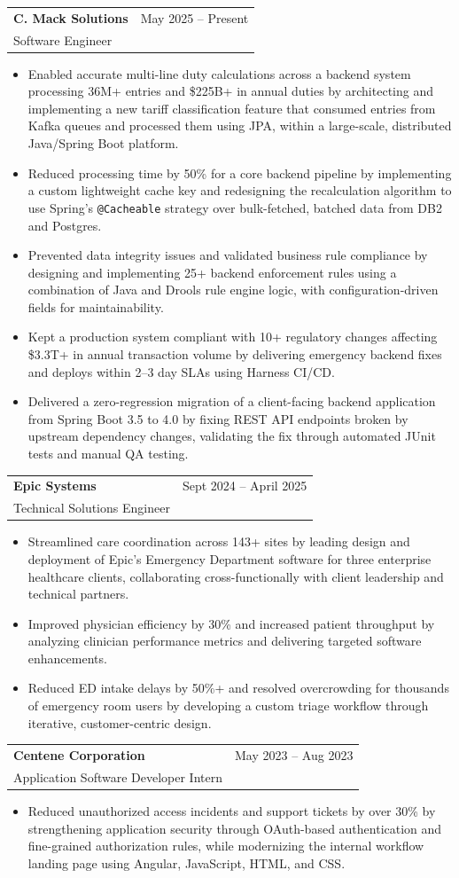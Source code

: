 \documentclass[letterpaper,11pt]{article}
\makeatletter
\newcommand{\resumeItem}[1]{
  \item\small{
    {#1 \vspace{-2pt}}
  }
}
\newcommand{\resumeSubheading}[4]{
  \vspace{-1pt}\item
    \begin{tabular*}{0.97\textwidth}[t]{l@{\extracolsep{\fill}}r}
      \textbf{#1} & #2 \\
      #3 & \textit{\small #4} \\
    \end{tabular*}\vspace{-5pt}
}
\newcommand{\resumeItemListStart}{\begin{itemize}[itemsep=-1pt]}
\newcommand{\resumeItemListEnd}{\end{itemize}\vspace{-4pt}}
\makeatother
\begin{document}
    \resumeSubheading
      {C. Mack Solutions}{May 2025 -- Present}
      {Software Engineer}{}
      \resumeItemListStart
        \resumeItem{Enabled accurate multi-line duty calculations across a backend system processing 36M+ entries and \$225B+ in annual duties by architecting and implementing a new tariff classification feature that consumed entries from Kafka queues and processed them using JPA, within a large-scale, distributed Java/Spring Boot platform.}
        \resumeItem{Reduced processing time by 50\% for a core backend pipeline by implementing a custom lightweight cache key and redesigning the recalculation algorithm to use Spring's \texttt{@Cacheable} strategy over bulk-fetched, batched data from DB2 and Postgres.}
        \resumeItem{Prevented data integrity issues and validated business rule compliance by designing and implementing 25+ backend enforcement rules using a combination of Java and Drools rule engine logic, with configuration-driven fields for maintainability.}
        \resumeItem{Kept a production system compliant with 10+ regulatory changes affecting \$3.3T+ in annual transaction volume by delivering emergency backend fixes and deploys within 2--3 day SLAs using Harness CI/CD.}
        \resumeItem{Delivered a zero-regression migration of a client-facing backend application from Spring Boot 3.5 to 4.0 by fixing REST API endpoints broken by upstream dependency changes, validating the fix through automated JUnit tests and manual QA testing.}
      \resumeItemListEnd

    \resumeSubheading
      {Epic Systems}{Sept 2024 -- April 2025}
      {Technical Solutions Engineer}{}
      \resumeItemListStart
        \resumeItem{Streamlined care coordination across 143+ sites by leading design and deployment of Epic's Emergency Department software for three enterprise healthcare clients, collaborating cross-functionally with client leadership and technical partners.}
        \resumeItem{Improved physician efficiency by 30\% and increased patient throughput by analyzing clinician performance metrics and delivering targeted software enhancements.}
        \resumeItem{Reduced ED intake delays by 50\%+ and resolved overcrowding for thousands of emergency room users by developing a custom triage workflow through iterative, customer-centric design.}
      \resumeItemListEnd

    \resumeSubheading
      {Centene Corporation}{May 2023 -- Aug 2023}
      {Application Software Developer Intern}{}
      \resumeItemListStart
        \resumeItem{Reduced unauthorized access incidents and support tickets by over 30\% by strengthening application security through OAuth-based authentication and fine-grained authorization rules, while modernizing the internal workflow landing page using Angular, JavaScript, HTML, and CSS.}
      \resumeItemListEnd
\end{document}
